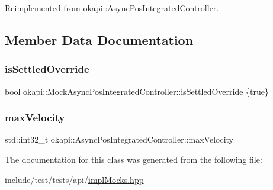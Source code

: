 Reimplemented from \mbox{\hyperlink{classokapi_1_1AsyncPosIntegratedController_a21b7ee29d335ee33aed1c41969a27f62}{okapi\+::\+Async\+Pos\+Integrated\+Controller}}.



\subsection{Member Data Documentation}
\mbox{\label{classokapi_1_1MockAsyncPosIntegratedController_accca10115217790de7658f65d4c3f9c9}} 
\subsubsection{\texorpdfstring{isSettledOverride}{isSettledOverride}}
{\footnotesize\ttfamily bool okapi\+::\+Mock\+Async\+Pos\+Integrated\+Controller\+::is\+Settled\+Override \{true\}}

\mbox{\label{classokapi_1_1MockAsyncPosIntegratedController_a7a95aef2b429d73a6c8b1696f02727dd}} 
\subsubsection{\texorpdfstring{maxVelocity}{maxVelocity}}
{\footnotesize\ttfamily std\+::int32\+\_\+t okapi\+::\+Async\+Pos\+Integrated\+Controller\+::max\+Velocity}



The documentation for this class was generated from the following file\+:\begin{DoxyCompactItemize}
\item 
include/test/tests/api/\mbox{\hyperlink{implMocks_8hpp}{impl\+Mocks.\+hpp}}\end{DoxyCompactItemize}
